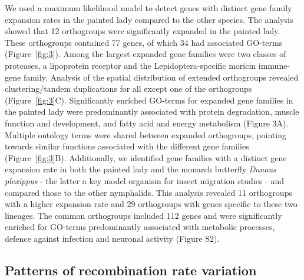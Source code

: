 \documentclass[twocolumn]{bmcart}%
\begin{document}
We used a maximum likelihood model to detect genes with distinct gene family expansion rates in the painted lady compared to the other species. The analysis showed that 12 orthogroups were significantly expanded in the painted lady. These orthogroups contained 77 genes, of which 34 had associated GO-terms (Figure~\ref{fig:3}). Among the largest expanded gene families were two classes of proteases, a lipoprotein receptor and the Lepidoptera-specific moricin immune-gene family. Analysis of the spatial distribution of extended orthogroups revealed clustering/tandem duplications for all except one of the orthogroups (Figure~\ref{fig:3}C). Significantly enriched GO-terms for expanded gene families in the painted lady were predominantly associated with protein degradation, muscle function and development, and fatty acid and energy metabolism (Figure 3A). Multiple ontology terms were shared between expanded orthogroups, pointing towards similar functions associated with the different gene families (Figure~\ref{fig:3}B). Additionally, we identified gene families with a distinct gene expansion rate in both the painted lady and the monarch butterfly \textit{Danaus plexippus} - the latter a key model organism for insect migration studies - and compared those to the other nymphalids. This analysis revealed 11 orthogroups with a higher expansion rate and 29 orthogroups with genes specific to these two lineages. The common orthogroups included 112 genes and were significantly enriched for GO-terms predominantly associated with metabolic processes, defence against infection and neuronal activity (Figure S2).

\subsection*{Patterns of recombination rate variation}
\end{document}
